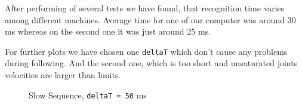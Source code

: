 \documentclass[]{scrartcl}
\begin{document}
After performing of several tests we have found, that recognition time varies among different machines. Average time for one of our computer was around 30 ms whereas on the second one it was just around 25 ms.

For further plots we have chosen one \texttt{deltaT} which don't cause any problems during following. And the second one, which is too short and unsaturated joints velocities are larger than limits.

\begin{figure}[!htp]
	\hfill
	\caption{Slow Sequence, \texttt{deltaT = 50} ms}
	\label{fig:SlowSequence_dT50_following_error_vs_time}
\end{figure}
\end{document}
